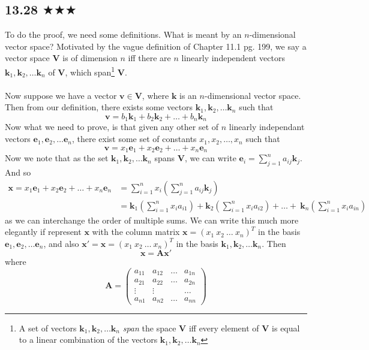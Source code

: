 \subsection{13.28 $\bigstar\bigstar\bigstar$}
To do the proof, we need some definitions. What is meant by an $n$-dimensional vector space? Motivated by the vague definition of Chapter 11.1 pg. 199, we say a vector space $\mathbf{V}$ is of dimension $n$ iff there are $n$ linearly independent vectors $\mathbf{k}_1,\mathbf{k}_2,\ldots \mathbf{k}_n$ of $\mathbf{V}$, which span\footnote{A set of vectors $\mathbf{k}_1,\mathbf{k}_2,\ldots \mathbf{k}_n$ \emph{span} the space $\mathbf{V}$ iff every element of $\mathbf{V}$ is equal to a linear combination of the vectors $\mathbf{k}_1,\mathbf{k}_2,\ldots \mathbf{k}_n$} $\mathbf{V}$. \\ \\ Now suppose we have a vector $\mathbf{v}\in \mathbf{V}$, where $\mathbf{k}$ is an $n$-dimensional vector space. Then from our definition, there exists some vectors $\mathbf{k}_1,\mathbf{k}_2,\ldots \mathbf{k}_n$ such that
$$\mathbf{v}=b_1\mathbf{k}_1+b_2\mathbf{k}_2+\ldots +b_n\mathbf{k}_n$$    
Now what we need to prove, is that given any other set of $n$ linearly independant vectors $\mathbf{e}_1,\mathbf{e}_2,\ldots \mathbf{e}_n$, there exist some set of constants $x_1,x_2,\ldots,x_n$ such that
$$\mathbf{v}=x_1\mathbf{e}_1+x_2\mathbf{e}_2+\ldots +x_n\mathbf{e}_n$$ 
Now we note that as the set $\mathbf{k}_1,\mathbf{k}_2,\ldots \mathbf{k}_n$ spans $\mathbf{V}$, we can write $\mathbf{e}_i=\sum^{n}_{j=1}a_{ij} \mathbf{k}_j$. And so 
\begin{align*}
\mathbf{x}=x_1\mathbf{e}_1+x_2\mathbf{e}_2+\ldots +x_n\mathbf{e}_n&=\sum_{i=1}^{n} x_i\left(\sum^{n}_{j=1}a_{ij} \mathbf{k}_j\right)\\
&=\mathbf{k}_1\left(\sum_{i=1}^{n}x_i a_{i1}\right)+\mathbf{k}_2\left(\sum_{i=1}^{n}x_i a_{i2}\right)+\ldots+\ \mathbf{k}_n\left(\sum_{i=1}^{n}x_i a_{in}\right)
\end{align*}
as we can interchange the order of multiple sums. We can write this much more elegantly if represent $\mathbf{x}$ with the column matrix $\mathbf{x}=(x_1\ x_2 \ \ldots\ x_n)^T$ in the basis $\mathbf{e}_1,\mathbf{e}_2,\ldots \mathbf{e}_n$, and also $\mathbf{x}'=\mathbf{x}=(x_1\ x_2 \ \ldots\ x_n)^T$ in the basis $\mathbf{k}_1,\mathbf{k}_2,\ldots \mathbf{k}_n$. Then
$$\mathbf{x}=\mathbf{A} \mathbf{x}'$$
where
$$\mathbf{A}=\begin{pmatrix} a_{11} & a_{12} &\ldots & a_{1n}\\
a_{21} & a_{22} &\ldots & a_{2n}\\
\vdots & \vdots & &\ldots \\
a_{n1}&a_{n2}&\ldots &a_{nn}\end{pmatrix}$$
